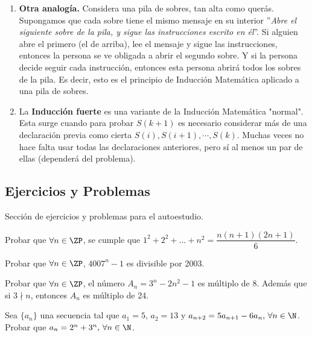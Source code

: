     \begin{enumerate}
        \item { \textbf{Otra analogía.}
        Considera una pila de sobres, tan alta como querás.
        Supongamos que cada sobre tiene el mismo mensaje en su interior ''\textit{Abre el siguiente sobre de la pila, y sigue las instrucciones escrito en él}''.
        Si alguien abre el primero (el de arriba), lee el mensaje y sigue las instrucciones, entonces la persona se ve obligada a abrir el segundo sobre.
        Y si la persona decide seguir cada instrucción, entonces esta persona abrirá todos los sobres de la pila.
        Es decir, esto es el principio de Inducción Matemática aplicado a una pila de sobres.}

        \item La \textbf{Inducción fuerte} es una variante de la Inducción Matemática "normal". Esta surge cuando para probar $S(k + 1)$ es necesario considerar más de una declaración previa como cierta $S(i), S(i + 1), \cdots, S(k)$. Muchas veces no hace falta usar todas las declaraciones anteriores, pero sí al menos un par de ellas (dependerá del problema).
    \end{enumerate}


\subsection{Ejercicios y Problemas}

    Sección de ejercicios y problemas para el autoestudio.

    \begin{section-problem}
        Probar que $\forall n \in \ZP$, se cumple que $1^2 + 2^2 + \dots + n^2 = \dfrac{n(n+1)(2n+1)}{6}$.
    \end{section-problem}

    \begin{section-problem}
        Probar que $\forall n\in \ZP$, $4007^n - 1$ es divisible por 2003.
    \end{section-problem}

    \begin{section-problem}
        Probar que $\forall n \in \ZP$, el número $A_n = 3^n - 2n^2 - 1$ es múltiplo de $8$.
        Además que si $3\nmid n$, entonces $A_n$ es múltiplo de 24.
    \end{section-problem}

    \begin{section-problem}
        Sea $\{a_n\}$ una secuencia tal que $a_1 = 5$, $a_2 = 13$ y $a_{n+2}=5a_{n+1}-6a_n\text{,}\ \forall n \in \N$.
        Probar que $a_n = 2^n+3^n \text{,}\ \forall n \in \N$.
    \end{section-problem}


